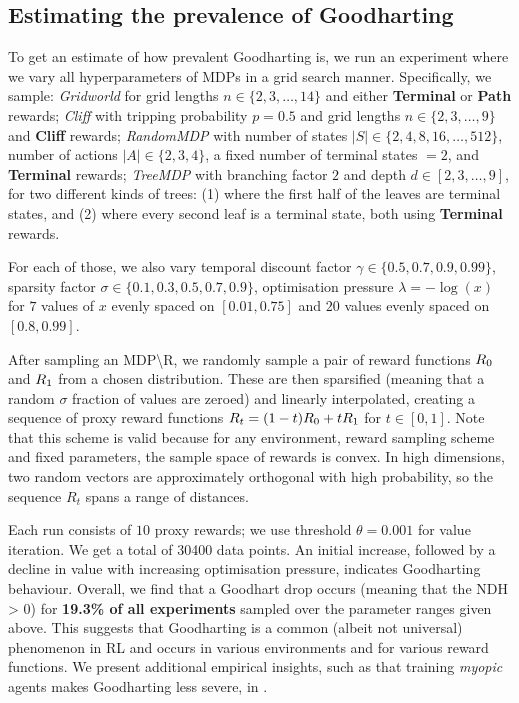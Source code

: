 \subsection{Estimating the prevalence of Goodharting}\label{subsect:estimating-prevalence}

To get an estimate of how prevalent Goodharting is, we run an experiment where we vary all hyperparameters of MDPs in a grid search manner. Specifically, we sample:
\emph{Gridworld} for grid lengths $n \in \{2, 3, \dots, 14\}$ %
and either \textbf{Terminal} or \textbf{Path} rewards;
\emph{Cliff} with tripping probability $p = 0.5$ and grid lengths $n \in \{2, 3, \dots, 9\}$ %
and \textbf{Cliff} rewards; 
\emph{RandomMDP} with number of states $|S| \in \{2, 4, 8, 16, \dots, 512\}$, %
number of actions $|A| \in \{2, 3, 4\}$, a fixed number of terminal states $=2$, and \textbf{Terminal} rewards;
\emph{TreeMDP} with branching factor $2$ and depth $d \in [2, 3, \dots, 9]$, %
for two different kinds of trees: (1) where the first half of the leaves are terminal states, and (2) where every second leaf is a terminal state, both using \textbf{Terminal} rewards.

For each of those, we also vary temporal discount factor $\gamma \in \{0.5, 0.7, 0.9, 0.99\}$, sparsity factor $\sigma \in \{0.1, 0.3, 0.5, 0.7, 0.9\}$, optimisation pressure $\lambda = -\log(x)$ for $7$ values of $x$ evenly spaced on $[0.01, 0.75]$ and $20$ values evenly spaced on $[0.8, 0.99]$.

After sampling an MDP\textbackslash R, we randomly sample a pair of reward functions $R_0$ and $R_1$ from a chosen distribution. These are then sparsified (meaning that a random $\sigma$ fraction of values are zeroed) and linearly interpolated, creating a sequence of proxy reward functions $R_t = (1-t)R_0 + tR_1$ for $t \in [0,1]$. 
Note that this scheme is valid because for any environment, reward sampling scheme and fixed parameters, the sample space of rewards is convex. In high dimensions, two random vectors are approximately orthogonal with high probability, so the sequence $R_t$ spans a range of distances.

Each run consists of $10$ proxy rewards; we use threshold $\theta = 0.001$ for value iteration. We get a total of 30400 data points. An initial increase, followed by a decline in value with increasing optimisation pressure, indicates Goodharting behaviour. Overall, we find that a Goodhart drop occurs (meaning that the NDH > 0) for \textbf{19.3\% of all experiments} sampled over the parameter ranges given above. This suggests that Goodharting is a common (albeit not universal) phenomenon in RL and occurs in various environments and for various reward functions. We present additional empirical insights, such as that training \emph{myopic} agents makes  Goodharting less severe, in .

